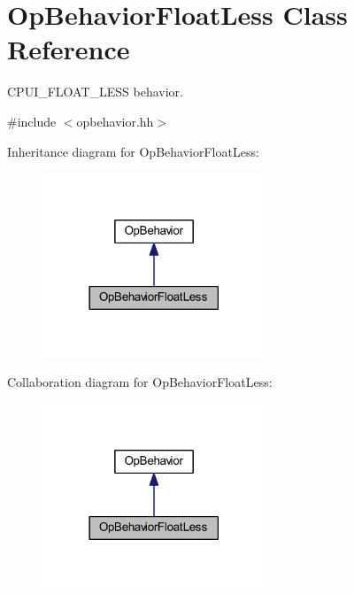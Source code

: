 \hypertarget{class_op_behavior_float_less}{}\section{Op\+Behavior\+Float\+Less Class Reference}
\label{class_op_behavior_float_less}


C\+P\+U\+I\+\_\+\+F\+L\+O\+A\+T\+\_\+\+L\+E\+SS behavior.  




{\ttfamily \#include $<$opbehavior.\+hh$>$}



Inheritance diagram for Op\+Behavior\+Float\+Less\+:
\nopagebreak
\begin{figure}[H]
\begin{center}
\leavevmode
\includegraphics[width=189pt]{class_op_behavior_float_less__inherit__graph}
\end{center}
\end{figure}


Collaboration diagram for Op\+Behavior\+Float\+Less\+:
\nopagebreak
\begin{figure}[H]
\begin{center}
\leavevmode
\includegraphics[width=189pt]{class_op_behavior_float_less__coll__graph}
\end{center}
\end{figure}
